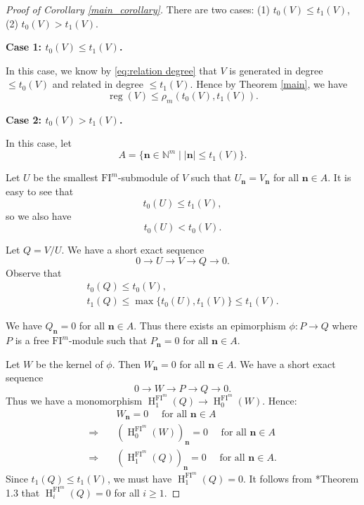 \documentclass{amsart}
\numberwithin{equation}{section}
\DeclareMathOperator{\reg}{reg}
\DeclareMathOperator{\HH}{H}
\newcommand{\N}{{\mathbb{N}}}
\newcommand{\FI}{{\mathrm{FI}}}
\begin{document}
\begin{proof}[Proof of Corollary \ref{main_corollary}]
   There are two cases: (1) $t_0(V)\leqslant t_1(V)$, (2) $t_0(V)>t_1(V)$.

   \medskip 

   {\bf Case 1: $t_0(V)\leqslant t_1(V)$.} 
   
   In this case, we know by \eqref{eq:relation degree} that $V$ is generated in degree $\leqslant t_0(V)$ and related in degree $\leqslant t_1(V)$. Hence by Theorem \ref{main}, we have 
   \[ \reg(V) \leqslant \rho_m(t_0(V), t_1(V)). \]

   \medskip 


   {\bf Case 2: $t_0(V)>t_1(V)$.} 
   
   In this case, let 
   \[ A = \{ \mathbf{n} \in \N^m \mid |\mathbf{n}| \leqslant t_1(V) \}. \]  

   Let $U$ be the smallest $\FI^m$-submodule of $V$ such that $U_{\mathbf{n}} = V_{\mathbf{n}}$ for all $\mathbf{n}\in A$. It is easy to see that 
   \[ t_0(U)\leqslant t_1(V), \]
   so we also have 
   \begin{equation}  \label{eq:t0U less than t0V}
      t_0(U) < t_0(V). 
   \end{equation}

   Let $Q=V/U$. We have a short exact sequence 
   \[ 0 \to U \to V \to Q \to 0. \]
   Observe that
   \begin{gather*}
      t_0(Q) \leqslant t_0(V),\\
      t_1(Q) \leqslant \max\{ t_0(U), t_1(V) \} \leqslant t_1(V).
   \end{gather*}
   
   We have $Q_{\mathbf{n}} = 0$ for all $\mathbf{n}\in A$. Thus there exists an epimorphism $\phi: P\to Q$ where $P$ is a free $\FI^m$-module such that $P_{\mathbf{n}}=0$ for all $\mathbf{n}\in A$. 
   
   Let $W$ be the kernel of $\phi$. Then $W_{\mathbf{n}}=0$ for all $\mathbf{n}\in A$. We have a short exact sequence 
   \[ 0 \to W \to P \to Q \to 0. \] 
   Thus we have a monomorphism $\HH^{\FI^m}_1(Q) \to \HH^{\FI^m}_0(W)$. Hence:
   \begin{align*}
      & W_{\mathbf{n}}=0 \quad \mbox{ for all }\mathbf{n}\in A\\
      \Longrightarrow \quad & (\HH^{\FI^m}_0(W))_{\mathbf{n}}=0 \quad \mbox{ for all }\mathbf{n}\in A\\
      \Longrightarrow \quad & (\HH^{\FI^m}_1(Q))_{\mathbf{n}} = 0 \quad \mbox{ for all }\mathbf{n}\in A.
   \end{align*}  
    Since $t_1(Q)\leqslant t_1(V)$, we must have $\HH^{\FI^m}_1(Q)=0$. It follows from \cite{liyu}*{Theorem 1.3} that $\HH^{\FI^m}_i(Q)=0$ for all $i\geqslant 1$. 


\end{proof}
\end{document}
